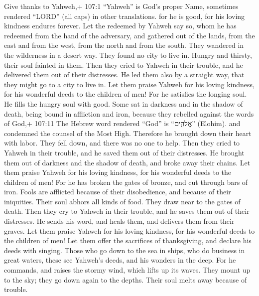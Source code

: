  Give thanks to Yahweh,+ 107:1 ``Yahweh'' is God's proper
Name, sometimes rendered ``LORD'' (all caps) in other translations. for
he is good, for his loving kindness endures forever.  Let
the redeemed by Yahweh say so, whom he has redeemed from the hand of the
adversary,  and gathered out of the lands, from the east and
from the west, from the north and from the south.  They
wandered in the wilderness in a desert way. They found no city to live
in.  Hungry and thirsty, their soul fainted in them.
 Then they cried to Yahweh in their trouble, and he
delivered them out of their distresses.  He led them also by
a straight way, that they might go to a city to live in. 
Let them praise Yahweh for his loving kindness, for his wonderful deeds
to the children of men!  For he satisfies the longing soul.
He fills the hungry soul with good.  Some sat in darkness
and in the shadow of death, being bound in affliction and iron,
 because they rebelled against the words of God,+ 107:11
The Hebrew word rendered ``God'' is ``אֱלֹהִ֑ים'' (Elohim). and
condemned the counsel of the Most High.  Therefore he
brought down their heart with labor. They fell down, and there was no
one to help.  Then they cried to Yahweh in their trouble,
and he saved them out of their distresses.  He brought them
out of darkness and the shadow of death, and broke away their chains.
 Let them praise Yahweh for his loving kindness, for his
wonderful deeds to the children of men!  For he has broken
the gates of bronze, and cut through bars of iron.  Fools
are afflicted because of their disobedience, and because of their
iniquities.  Their soul abhors all kinds of food. They draw
near to the gates of death.  Then they cry to Yahweh in
their trouble, and he saves them out of their distresses. 
He sends his word, and heals them, and delivers them from their graves.
 Let them praise Yahweh for his loving kindness, for his
wonderful deeds to the children of men!  Let them offer the
sacrifices of thanksgiving, and declare his deeds with singing.
 Those who go down to the sea in ships, who do business in
great waters,  these see Yahweh's deeds, and his wonders in
the deep.  For he commands, and raises the stormy wind,
which lifts up its waves.  They mount up to the sky; they
go down again to the depths. Their soul melts away because of trouble.
